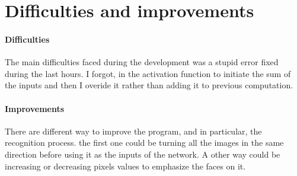 \section{Difficulties and improvements}

\paragraph{Difficulties}{
    The main difficulties faced during the development was a stupid error fixed
 during the last hours. I forgot, in the activation function to initiate the
 sum of the inputs and then I overide it rather than adding it to previous
 computation.
}

\paragraph{Improvements}{
    There are different way to improve the program, and in particular, the 
 recognition process. the first one could be turning all the images in the same
 direction before using it as the inputs of the network. A other way could be
 increasing or decreasing pixels values to emphasize the faces on it.
}
